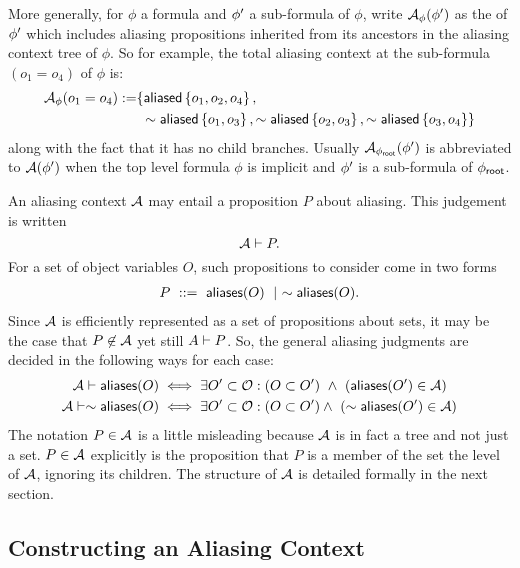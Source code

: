 %
More generally, for $\phi$ a formula and $\phi^\prime$ a sub-formula of $\phi$, write $\mathcal{A}_\phi(\phi^\prime)$ as the  of $\phi^\prime$ which includes aliasing propositions inherited from its ancestors in the aliasing context tree of $\phi$.
So for example, the total aliasing context at the sub-formula $(o_1 = o_4)$ of $\phi$ is:
\begin{align*}
  \mathcal{A}_\phi(o_1 = o_4) := &
  \{
    \textsf{aliased}\left\{ o_1, o_2, o_4 \right\}, \\ & \
    \sim \textsf{aliased}\left\{ o_1, o_3 \right\},
    \sim \textsf{aliased}\left\{ o_2, o_3 \right\},
    \sim \textsf{aliased}\left\{ o_3, o_4 \right\}
  \}
\end{align*}
along with the fact that it has no child branches.
Usually $\mathcal{A}_{\phi_\textsf{root}}(\phi^\prime)$ is abbreviated to $\mathcal{A}(\phi^\prime)$ when the top level formula $\phi$ is implicit and $\phi^\prime$ is a sub-formula of ${\phi_\textsf{root}}$.

An aliasing context $\mathcal{A}$ may entail a proposition $P$ about aliasing. This judgement is written
$$
\mathcal{A} \vdash P.
$$
For a set of object variables $O$, such propositions to consider come in two forms
\begin{align*}
P \ ::= \ \textsf{aliases}(O) \ \mid \ \sim \textsf{aliases}(O).
\end{align*}
Since $\mathcal{A}$ is efficiently represented as a set of propositions about sets, it may be the case that $P \not\in \mathcal{A}$ yet still $A \vdash P$.
So, the general aliasing judgments are decided in the following ways for each case:
\begin{align*}
\mathcal{A} \vdash \textsf{aliases}(O)
&\iff
\exists O^\prime \subset \mathcal{O} : (O \subset O^\prime) \ \land \ (\textsf{aliases}(O^\prime) \in \mathcal{A})
\\
\mathcal{A} \vdash \sim \textsf{aliases}(O)
&\iff
\exists O^\prime \subset \mathcal{O} : (O \subset O^\prime) \land \ (\sim \textsf{aliases}(O^\prime) \in \mathcal{A})
\end{align*}
The notation $P \in \mathcal{A}$ is a little misleading because $\mathcal{A}$ is in fact a tree and not just a set. $P \in \mathcal{A}$ explicitly is the proposition that $P$ is a member of the set  the level of $\mathcal{A}$, ignoring its children. The structure of $\mathcal{A}$ is detailed formally in the next section.

\subsection{Constructing an Aliasing Context}


